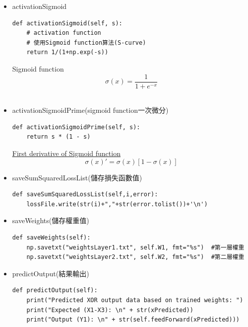 \documentclass[12pt, a4paper]{article}
\begin{document}
\begin{itemize}
\item activationSigmoid\\
\begin{lstlisting}
def activationSigmoid(self, s):
    # activation function
    # 使用Sigmoid function算法(S-curve)
    return 1/(1+np.exp(-s))
\end{lstlisting}
Sigmoid function 
$$\sigma(x)=\frac{1}{1+e^{-x}}$$\\
\end{itemize}

\begin{itemize}
\item activationSigmoidPrime(sigmoid function一次微分)\\
\begin{lstlisting}
def activationSigmoidPrime(self, s):
    return s * (1 - s)
\end{lstlisting}
\href{https://towardsdatascience.com/derivative-of-the-sigmoid-function-536880cf918e}{\underline{First derivative of Sigmoid function}}
$$\sigma(x)'=\sigma(x)[1-\sigma(x)]$$
\end{itemize}

\begin{itemize}
\item saveSumSquaredLossList(儲存損失函數值)\\
\begin{lstlisting}
def saveSumSquaredLossList(self,i,error):
    lossFile.write(str(i)+","+str(error.tolist())+'\n')
\end{lstlisting}
\end{itemize}

\begin{itemize}
\item saveWeights(儲存權重值)\\
\begin{lstlisting}
def saveWeights(self):
    np.savetxt("weightsLayer1.txt", self.W1, fmt="%s")  #第一層權重
    np.savetxt("weightsLayer2.txt", self.W2, fmt="%s")  #第二層權重
\end{lstlisting}
\end{itemize}

\begin{itemize}
\item predictOutput(結果輸出)\\
\begin{lstlisting}
def predictOutput(self):
    print("Predicted XOR output data based on trained weights: ")
    print("Expected (X1-X3): \n" + str(xPredicted))
    print("Output (Y1): \n" + str(self.feedForward(xPredicted)))
\end{lstlisting}
\end{itemize}
\end{document}
